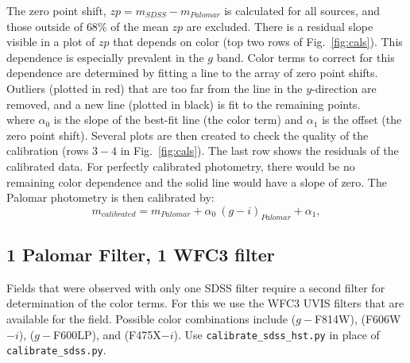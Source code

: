 \documentclass{article}
\begin{document}
\noindent The zero point shift, $zp = m_{SDSS} - m_{Palomar}$ 
is calculated for all sources, and those outside of $68\%$ of the
mean $zp$ are excluded. There is a residual slope visible in a plot of 
$zp$ that depends on color (top two rows of Fig.~\ref{fig:cals}).
This dependence is especially prevalent in the $g$ band.
Color terms to correct for this dependence 
are determined by fitting a line to the array of 
zero point shifts. Outliers (plotted in red) that are too far from the 
line in the 
$y$-direction are removed, and a new line (plotted in black) 
is fit to the remaining points. \\


\noindent where $\alpha_0$ is the slope of the best-fit line (the color term)
and $\alpha_1$ is the offset (the zero point shift). Several plots
are then created to check the quality of the calibration (rows $3-4$ in 
Fig.~\ref{fig:cals}). The last row shows the residuals of the calibrated 
data. For perfectly calibrated photometry, there would be no remaining
color dependence and the solid line would have a slope of zero. 
The Palomar photometry is then calibrated by:
\begin{equation}
m_{calibrated} = m_{Palomar} + \alpha_0~(g-i)_{Palomar} + \alpha_1,
\label{eqn:cal}
\end{equation}

\subsection{1 Palomar Filter, 1 WFC3 filter}
Fields that were observed with only one SDSS filter require a second
filter for determination of the color terms. For this we use the WFC3
UVIS filters that are available for the field. Possible color combinations
include ($g-$F814W), (F606W$-i$), ($g-$F600LP), and (F475X$-i$).
Use \texttt{calibrate\_sdss\_hst.py} in place of 
\texttt{calibrate\_sdss.py}.


\vspace{4 mm}
\end{document}
